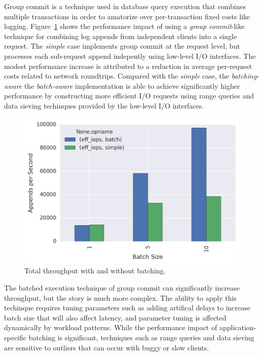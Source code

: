 Group commit is a technique used in database query execution that combines
multiple transactions in order to amatorize over per-transaction fixed costs
like logging. Figure~\ref{fig:batching} shows the performance impact of using
a \emph{group commit}-like technique for combining log appends from
independent clients into a single request.  The \emph{simple} case implements
group commit at the request level, but processes each sub-request append
indepently using low-level I/O interfaces. The modest performance increase is
attributed to a reduction in average per-request costs related to network
roundtrips. Compared with the \emph{simple} case, the \emph{batching-aware}
the \emph{batch-aware} implementation is able to achieve significantly higher
performance by constructing more efficient I/O requests using range queries
and data sieving techinques provided by the low-level I/O interfaces.

\begin{figure}
\centering
\includegraphics[width=1.0\linewidth]{batching.png}
\caption{Total throughput with and without batching.}
\label{fig:batching}
\end{figure}

The batched execution technique of group commit can significantly increase
throughput, but the story is much more complex. The ability to apply this
techinque requires tuning parameters such as adding artifical delays to
increase batch size that will also affect latency, and parameter tuning is
affected dynamically by workload patterns.  While the performance impact of
application-specific batching is significant, techniques such as range queries
and data sieving are sensitive to outliers that can occur with buggy or slow
clients.

